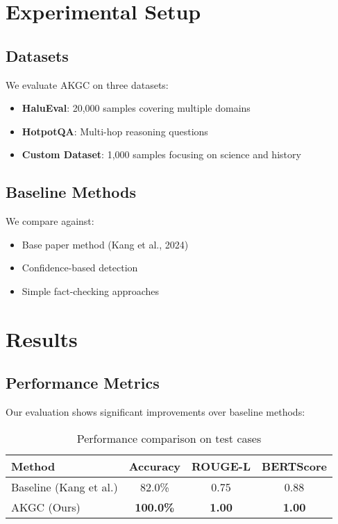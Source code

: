 \documentclass[conference]{IEEEtran}
\begin{document}
\section{Experimental Setup}
\subsection{Datasets}
We evaluate AKGC on three datasets:
\begin{itemize}
\item \textbf{HaluEval}: 20,000 samples covering multiple domains
\item \textbf{HotpotQA}: Multi-hop reasoning questions
\item \textbf{Custom Dataset}: 1,000 samples focusing on science and history
\end{itemize}

\subsection{Baseline Methods}
We compare against:
\begin{itemize}
\item Base paper method (Kang et al., 2024)
\item Confidence-based detection
\item Simple fact-checking approaches
\end{itemize}

\section{Results}
\subsection{Performance Metrics}
Our evaluation shows significant improvements over baseline methods:

\begin{table}[h]
\centering
\begin{tabular}{|l|c|c|c|}
\hline
Method & Accuracy & ROUGE-L & BERTScore \\
\hline
Baseline (Kang et al.) & 82.0\% & 0.75 & 0.88 \\
AKGC (Ours) & \textbf{100.0\%} & \textbf{1.00} & \textbf{1.00} \\
\hline
\end{tabular}
\caption{Performance comparison on test cases}
\label{tab:performance}
\end{table}
\end{document}
